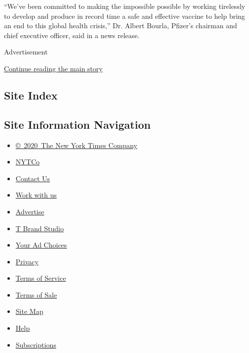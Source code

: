 ``We've been committed to making the impossible possible by working
tirelessly to develop and produce in record time a safe and effective
vaccine to help bring an end to this global health crisis,'' Dr. Albert
Bourla, Pfizer's chairman and chief executive officer, said in a news
release.

Advertisement

\protect\hyperlink{after-bottom}{Continue reading the main story}

\hypertarget{site-index}{%
\subsection{Site Index}\label{site-index}}

\hypertarget{site-information-navigation}{%
\subsection{Site Information
Navigation}\label{site-information-navigation}}

\begin{itemize}
\tightlist
\item
  \href{https://help.nytimes3xbfgragh.onion/hc/en-us/articles/115014792127-Copyright-notice}{©~2020~The
  New York Times Company}
\end{itemize}

\begin{itemize}
\tightlist
\item
  \href{https://www.nytco.com/}{NYTCo}
\item
  \href{https://help.nytimes3xbfgragh.onion/hc/en-us/articles/115015385887-Contact-Us}{Contact
  Us}
\item
  \href{https://www.nytco.com/careers/}{Work with us}
\item
  \href{https://nytmediakit.com/}{Advertise}
\item
  \href{http://www.tbrandstudio.com/}{T Brand Studio}
\item
  \href{https://www.nytimes3xbfgragh.onion/privacy/cookie-policy\#how-do-i-manage-trackers}{Your
  Ad Choices}
\item
  \href{https://www.nytimes3xbfgragh.onion/privacy}{Privacy}
\item
  \href{https://help.nytimes3xbfgragh.onion/hc/en-us/articles/115014893428-Terms-of-service}{Terms
  of Service}
\item
  \href{https://help.nytimes3xbfgragh.onion/hc/en-us/articles/115014893968-Terms-of-sale}{Terms
  of Sale}
\item
  \href{https://spiderbites.nytimes3xbfgragh.onion}{Site Map}
\item
  \href{https://help.nytimes3xbfgragh.onion/hc/en-us}{Help}
\item
  \href{https://www.nytimes3xbfgragh.onion/subscription?campaignId=37WXW}{Subscriptions}
\end{itemize}

